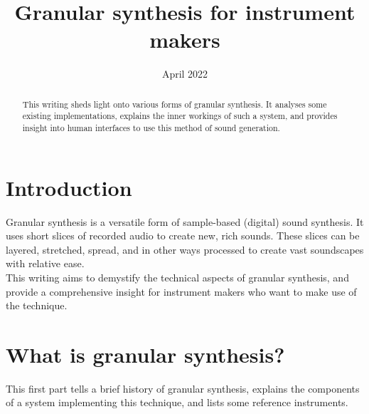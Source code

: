 \documentclass[10pt, twocolumn]{IEEEtran}
\title{Granular synthesis for instrument makers}
\author{	
	\IEEEauthorblockN{Daniël Kamp\\}
    \IEEEauthorblockA{HKU University of the Arts Utrecht
    \\daniel.kamp@student.hku.nl}
    }
\date{April 2022}
\begin{document}
\maketitle

\begin{abstract}
This writing sheds light onto various forms of granular synthesis. It analyses some existing implementations, explains the inner workings of such a system, and provides insight into human interfaces to use this method of sound generation.
\end{abstract}

\section*{Introduction}
Granular synthesis is a versatile form of sample-based (digital) sound synthesis. It uses short slices of recorded audio to create new, rich sounds. These slices can be layered, stretched, spread, and in other ways processed to create vast soundscapes with relative ease. \\
This writing aims to demystify the technical aspects of granular synthesis, and provide a comprehensive insight for instrument makers who want to make use of the technique.

\section{What is granular synthesis?}
This first part tells a brief history of granular synthesis, explains the components of a system implementing this technique, and lists some reference instruments.
\end{document}
